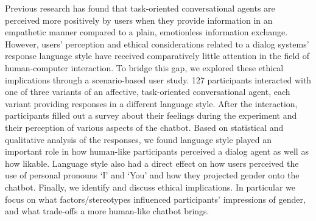 Previous research has found that task-oriented conversational agents are perceived more positively by users when they provide information in an empathetic manner compared to a plain, emotionless information exchange. However, users' perception and ethical considerations related to a dialog systems' response language style have received comparatively little attention in the field of human-computer interaction. To bridge this gap, we explored these ethical implications through a scenario-based user study. 127 participants interacted with one of three variants of an affective, task-oriented conversational agent, each variant providing responses in a different language style. After the interaction, participants filled out a survey about their feelings during the experiment and their perception of various aspects of the chatbot. Based on statistical and qualitative analysis of the responses, we found language style played an important role in how human-like participants perceived a dialog agent as well as how likable. Language style also had a direct effect on how users perceived the use of personal pronouns `I' and `You' and how they projected gender onto the chatbot. Finally, we identify and discuss ethical implications. In particular we focus on what factors/stereotypes influenced participants' impressions of gender, and what trade-offs a more human-like chatbot brings.
